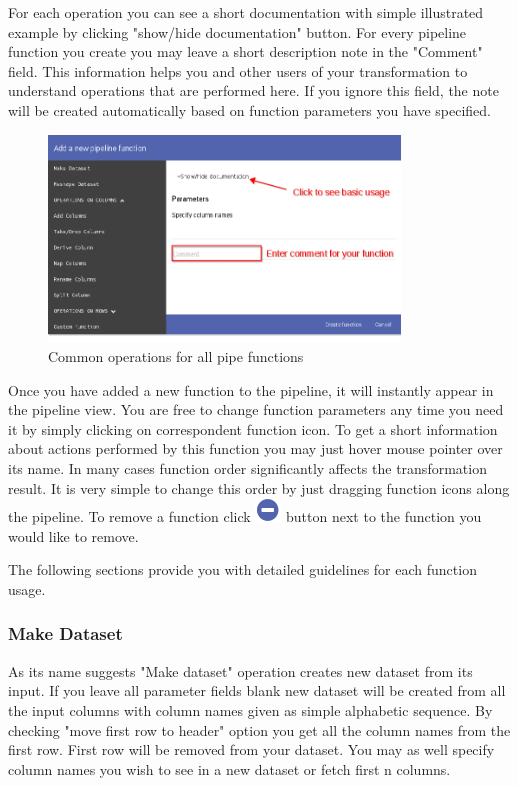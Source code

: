 \documentclass[USenglish]{article}
\begin{document}
 For each operation you can see a short documentation with simple illustrated example by clicking "show/hide documentation" button. For every pipeline function you create you may leave a short description note in the "Comment" field. This information helps you and other users of your transformation to understand operations that are performed here. If you ignore this field, the note will be created automatically based on function parameters you have specified.
 
 \begin{center}
\begin{figure}[!htbp]
\centering
\includegraphics[height=5.5cm] {pipefunccommon1.png}
 \caption{Common operations for all pipe functions \label{meta}}
\end{figure}
\end{center}

Once you have added a new function to the pipeline, it will instantly appear in the pipeline view. You are free to change function parameters any time you need it by simply clicking on correspondent function icon. To get a short information about actions performed by this function you may just hover mouse pointer over its name. In many cases function order significantly affects the transformation result. It is very simple to change this order by just dragging function icons along the pipeline. To remove a function click {\includegraphics[scale=0.5]{minus.png}} button next to the function you would like to remove.
 
 The following sections provide you with detailed guidelines for each function usage.

  
\subsubsection{Make Dataset \label{makedataset}}
As its name suggests "Make dataset" operation creates new dataset from its input. If you leave all parameter fields blank new dataset will be created from all the input columns with column names given as simple alphabetic sequence. By checking "move first row to header" option you get all the column names from the first row. First row will be removed from your dataset. You may as well specify column names you wish to see in a new dataset or fetch first n columns.
\end{document}
